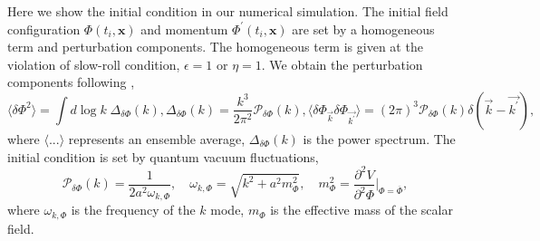 \documentclass[12pt, a4paper]{article}
\begin{document}
Here we show the initial condition in our numerical simulation. The initial field configuration $\Phi\left(t_i,\bm{x}\right)$ and momentum $\Phi^{\prime}\left(t_i,\bm{x}\right)$ are set by a homogeneous term and perturbation components. The homogeneous term is given at the violation of slow-roll condition, $\epsilon=1$ or $\eta=1$. We obtain the perturbation components following \cite{Figueroa:2020rrl}, 
\begin{equation}
\langle\delta\Phi^2\rangle=\int d \;\text{log}\; k \; \Delta_{\delta\Phi}\left(k\right), 
\Delta_{\delta\Phi}\left(k\right)=\frac{k^3}{2\pi^2}\mathcal{P}_{\delta\Phi}\left(k\right), \langle\delta\Phi_{\vec{k}}\delta\Phi_{\vec{k^{\prime}}}\rangle=\left(2\pi\right)^3\mathcal{P}_{\delta\Phi}\left(k\right)\delta(\vec{k}-\vec{k^{\prime}}),
\end{equation}
where $\langle ...\rangle$ represents an ensemble average, $\Delta_{\delta\Phi}\left(k\right)$ is the power spectrum. The initial condition is set by quantum vacuum fluctuations,
\begin{equation}
\label{eq:powerspectrum}
    \mathcal{P}_{\delta\Phi}\left(k\right)=\frac{1}{2a^2\omega_{k,\Phi}}, \quad
    \omega_{k,\Phi}=\sqrt{k^2+a^2 m^2_{\Phi}},\quad
    m^2_{\Phi}=\frac{\partial^2 V}{\partial^2\Phi}|_{\Phi=\overline{\Phi}},
\end{equation}
where $\omega_{k,\Phi}$ is the frequency of the $k$ mode, $m_{\Phi}$ is the effective mass of the scalar field.
\end{document}
